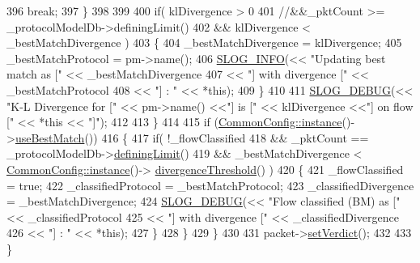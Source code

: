 \begin{DoxyCode}
396                 \textcolor{keywordflow}{break};
397             \}
398             
399 
400             \textcolor{keywordflow}{if}( klDivergence > 0 
401                 \textcolor{comment}{//&&\_pktCount >= \_protocolModelDb->definingLimit()}
402                 && klDivergence < \_bestMatchDivergence )
403             \{
404                 \_bestMatchDivergence = klDivergence;
405                 \_bestMatchProtocol = pm->name();
406                 \hyperlink{_logger_8h_a119c1c29ba35a8db38e2358e41167282}{SLOG\_INFO}(<< \textcolor{stringliteral}{"Updating best match as ["} << \_bestMatchDivergence 
407                                 << \textcolor{stringliteral}{"] with divergence ["} << \_bestMatchProtocol 
408                                 << \textcolor{stringliteral}{"] : "} << *\textcolor{keyword}{this});
409             \}
410  
411             \hyperlink{_logger_8h_a1eb7292acb79b8ddab9851b3a9f7a4da}{SLOG\_DEBUG}(<< \textcolor{stringliteral}{"K-L Divergence for ["} << pm->name() <<\textcolor{stringliteral}{"] is ["} << klDivergence <<\textcolor{stringliteral}{"] on
       flow ["} << *\textcolor{keyword}{this} << \textcolor{stringliteral}{"]"});
412             
413         \}
414 
415         \textcolor{keywordflow}{if} (\hyperlink{class_vsid_common_1_1_common_config_a69c29458a786be527fe66470ac9fbbdb}{CommonConfig::instance}()->\hyperlink{class_vsid_common_1_1_common_config_a459340bb4e0af6a87ab79a50f0467776}{useBestMatch}())
416         \{
417             \textcolor{keywordflow}{if}( !\_flowClassified 
418                     && \_pktCount == \_protocolModelDb->\hyperlink{class_vsid_1_1_protocol_model_db_a511e5fdf67995099e81175a6d34d1aac}{definingLimit}() 
419                     && \_bestMatchDivergence < \hyperlink{class_vsid_common_1_1_common_config_a69c29458a786be527fe66470ac9fbbdb}{CommonConfig::instance}()->
      \hyperlink{class_vsid_common_1_1_common_config_ac08bbad3a85c8ba4e43a591f7f02fe06}{divergenceThreshold}() )
420             \{
421                 \_flowClassified = \textcolor{keyword}{true};
422                 \_classifiedProtocol = \_bestMatchProtocol;
423                 \_classifiedDivergence = \_bestMatchDivergence;
424                 \hyperlink{_logger_8h_a1eb7292acb79b8ddab9851b3a9f7a4da}{SLOG\_DEBUG}(<< \textcolor{stringliteral}{"Flow classified (BM) as ["} << \_classifiedProtocol 
425                             << \textcolor{stringliteral}{"] with divergence ["} << \_classifiedDivergence 
426                             << \textcolor{stringliteral}{"] : "} << *\textcolor{keyword}{this});
427             \}
428         \}
429     \}
430 
431     packet->\hyperlink{class_vsid_common_1_1_i_pv4_packet_ae314f9e085588928d3c260211f80da87}{setVerdict}();
432 
433 \}\end{DoxyCode}


